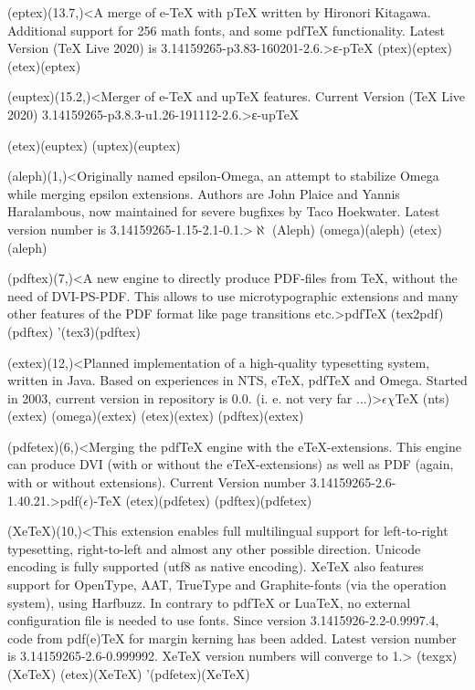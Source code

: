 {	\steplayer[-0.5]

	\tonode(eptex)(13.7,\layer)<A merge of e-TeX with pTeX written by Hironori Kitagawa. Additional support for 256 math fonts, and some pdfTeX functionality. Latest Version (TeX Live 2020) is 3.14159265-p3.83-160201-2.6.>{ε-p\TeX}
		\todraw(ptex)(eptex)
		\todraw(etex)(eptex)

	\steplayer[-1.5]

	\tonode(euptex)(15.2,\layer)<Merger of e-TeX and upTeX features. Current Version (TeX Live 2020) 3.14159265-p3.8.3-u1.26-191112-2.6.>{ε-up\TeX}

		\todraw(etex)(euptex)
		\todraw(uptex)(euptex)

	\tonode(aleph)(1,\layer)<Originally named epsilon-Omega, an attempt to stabilize Omega while merging epsilon extensions. Authors are John Plaice and Yannis Haralambous, now maintained for severe bugfixes by Taco Hoekwater. Latest version number is 3.14159265-1.15-2.1-0.1.>{$\aleph$ (Aleph)}
		\todraw(omega)(aleph)
		\todraw(etex)(aleph)
	
	\tonode[\vip](pdftex)(7,\layer)<A new engine to directly produce PDF-files from TeX, without the need of DVI-PS-PDF. This allows to use microtypographic extensions and many other features of the PDF format like page transitions etc.>{pdf\TeX}
		\todraw(tex2pdf)(pdftex)
		\todraw'(tex3)(pdftex)
	
	\steplayer[-1]

	\tonode[\experimental](extex)(12,\layer)<Planned implementation of a high-quality typesetting system, written in Java. Based on experiences in NTS, eTeX, pdfTeX and Omega. Started in 2003, current version in repository is 0.0. (i. e. not very far ...)>{$\epsilon\chi$\TeX}
		\todraw(nts)(extex)
		\todraw(omega)(extex)
		\todraw(etex)(extex)
		\todraw(pdftex)(extex)

	\steplayer[-1]
	
	\tonode[\vip](pdfetex)(6,\layer)<Merging the pdfTeX engine with the eTeX-extensions. This engine can produce DVI (with or without the eTeX-extensions) as well as PDF (again, with or without extensions). Current Version number 3.14159265-2.6-1.40.21.>{pdf($\epsilon$)-\TeX}
		\todraw*(etex)(pdfetex)
		\todraw*(pdftex)(pdfetex)

	\tonode[\vip](XeTeX)(10,\layer)<This extension enables full multilingual support for left-to-right typesetting, right-to-left and almost any other possible direction. Unicode encoding is fully supported (utf8 as native encoding). XeTeX also features support for OpenType, AAT, TrueType and Graphite-fonts (via the operation system), using Harfbuzz. In contrary to pdfTeX or LuaTeX, no external configuration file is needed to use fonts. Since version 3.1415926-2.2-0.9997.4, code from pdf(e)TeX for margin kerning has been added. Latest version number is 3.14159265-2.6-0.999992. XeTeX version numbers will converge to 1.>{\XeTeX}
		\todraw(texgx)(XeTeX)
		\todraw*(etex)(XeTeX)
		\todraw'(pdfetex)(XeTeX)
	
}
